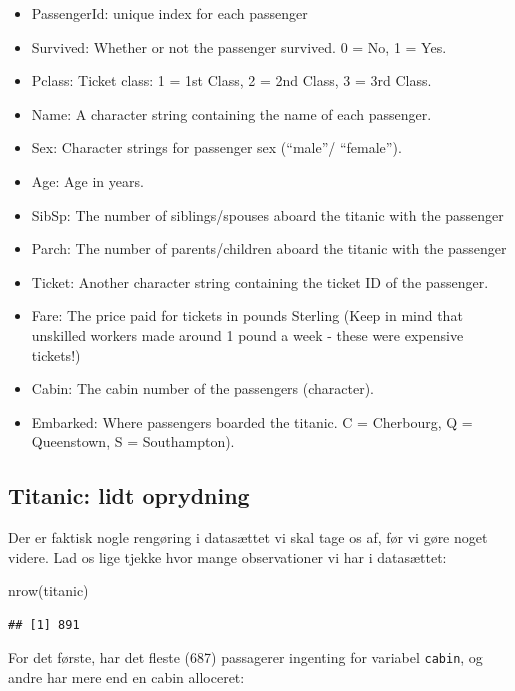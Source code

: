 \documentclass[
]{book}
\newenvironment{Shaded}{\begin{snugshade}}{\end{snugshade}}
\newcommand{\FunctionTok}[1]{\textcolor[rgb]{0.00,0.00,0.00}{#1}}
\newcommand{\NormalTok}[1]{#1}
\providecommand{\tightlist}{%
  \setlength{\itemsep}{0pt}\setlength{\parskip}{0pt}}
\begin{document}
\begin{itemize}
\tightlist
\item
  PassengerId: unique index for each passenger
\item
  Survived: Whether or not the passenger survived. 0 = No, 1 = Yes.
\item
  Pclass: Ticket class: 1 = 1st Class, 2 = 2nd Class, 3 = 3rd Class.
\item
  Name: A character string containing the name of each passenger.
\item
  Sex: Character strings for passenger sex (``male''/ ``female'').
\item
  Age: Age in years.
\item
  SibSp: The number of siblings/spouses aboard the titanic with the passenger
\item
  Parch: The number of parents/children aboard the titanic with the passenger
\item
  Ticket: Another character string containing the ticket ID of the passenger.
\item
  Fare: The price paid for tickets in pounds Sterling (Keep in mind that unskilled workers made around 1 pound a week - these were expensive tickets!)
\item
  Cabin: The cabin number of the passengers (character).
\item
  Embarked: Where passengers boarded the titanic. C = Cherbourg, Q = Queenstown, S = Southampton).
\end{itemize}

\hypertarget{titanic-lidt-oprydning}{%
\subsection{Titanic: lidt oprydning}\label{titanic-lidt-oprydning}}

Der er faktisk nogle rengøring i datasættet vi skal tage os af, før vi gøre noget videre. Lad os lige tjekke hvor mange observationer vi har i datasættet:

\begin{Shaded}
\begin{Highlighting}[]
\FunctionTok{nrow}\NormalTok{(titanic)}
\end{Highlighting}
\end{Shaded}

\begin{verbatim}
## [1] 891
\end{verbatim}

For det første, har det fleste (687) passagerer ingenting for variabel \texttt{cabin}, og andre har mere end en cabin alloceret:
\end{document}
